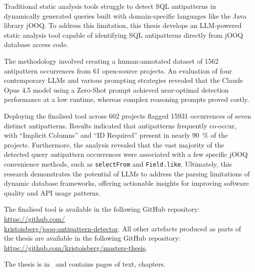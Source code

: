 Traditional static analysis tools struggle to detect SQL antipatterns in dynamically generated queries built with domain-specific languages like the Java library jOOQ. To address this limitation, this thesis develops an LLM-powered static analysis tool capable of identifying SQL antipatterns directly from jOOQ database access code.

The methodology involved creating a human-annotated dataset of \num{1562} antipattern occurrences from 61 open-source projects. An evaluation of four contemporary LLMs and various prompting strategies revealed that the Claude Opus 4.5 model using a Zero-Shot prompt achieved near-optimal detection performance at a low runtime, whereas complex reasoning prompts proved costly. 

Deploying the finalised tool across 602 projects flagged \num{15931} occurrences of seven distinct antipatterns. Results indicated that antipatterns frequently co-occur, with “Implicit Columns” and “ID Required” present in nearly \qty{90}{\percent} of the projects. Furthermore, the analysis revealed that the vast majority of the detected query antipattern occurrences were associated with a few specific jOOQ convenience methods, such as \texttt{selectFrom} and \texttt{Field.like}. Ultimately, this research demonstrates the potential of LLMs to address the parsing limitations of dynamic database frameworks, offering actionable insights for improving software quality and API usage patterns.

The finalised tool is available in the following GitHub repository: \href{https://github.com/kristoisberg/jooq-antipattern-detector}{https://github.com/\\kristoisberg/jooq-antipattern-detector}. All other artefacts produced as parts of the thesis are available in the following GitHub repository: \href{https://github.com/kristoisberg/masters-thesis}{https://github.com/kristoisberg/masters-thesis}.

The thesis is in \langEng~and contains \calculatepages pages of text, 
 chapters.
